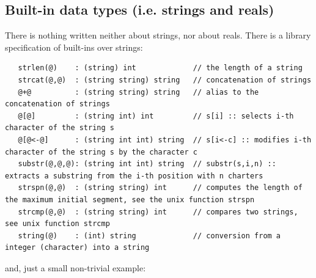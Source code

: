 \documentclass{article}
\begin{document}
\subsection{Built-in data types (i.e. strings and reals)}

There is nothing written neither about strings, nor about reals.
There is a library specification of built-ins over strings:
{\scriptsize \begin{verbatim}
   strlen(@)    : (string) int             // the length of a string
   strcat(@,@)  : (string string) string   // concatenation of strings
   @+@          : (string string) string   // alias to the concatenation of strings
   @[@]         : (string int) int         // s[i] :: selects i-th character of the string s
   @[@<-@]      : (string int int) string  // s[i<-c] :: modifies i-th character of the string s by the character c
   substr(@,@,@): (string int int) string  // substr(s,i,n) :: extracts a substring from the i-th position with n charters
   strspn(@,@)  : (string string) int      // computes the length of the maximum initial segment, see the unix function strspn
   strcmp(@,@)  : (string string) int      // compares two strings, see unix function strcmp
   string(@)    : (int) string             // conversion from a integer (character) into a string
\end{verbatim}}

and, just a small non-trivial example:
\end{document}

